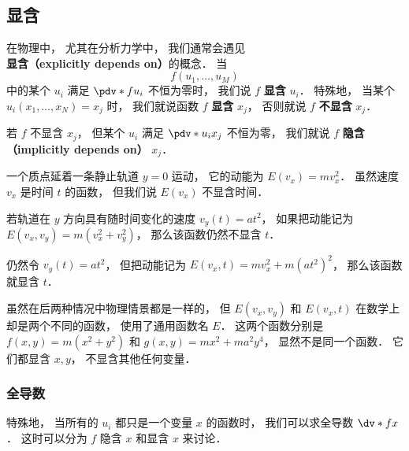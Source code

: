 \subsection{显含}
在物理中， 尤其在分析力学中， 我们通常会遇见\textbf{显含（explicitly depends on）}的概念． 当
\begin{equation}
f(u_1, \dots, u_M)
\end{equation}
中的某个 $u_i$ 满足 $\pdv*{f}{u_i}$ 不恒为零时， 我们说 $f$ \textbf{显含} $u_i$． 特殊地， 当某个 $u_i(x_1, \dots, x_N) = x_j$ 时， 我们就说函数 $f$ \textbf{显含} $x_j$， 否则就说 $f$ \textbf{不显含} $x_j$．

若 $f$ 不显含 $x_j$， 但某个 $u_i$ 满足 $\pdv*{u_i}{x_j}$ 不恒为零， 我们就说 $f$ \textbf{隐含（implicitly depends on）} $x_j$．

\begin{example}{}
一个质点延着一条静止轨道 $y = 0$ 运动， 它的动能为 $E(v_x) = m v_x^2$． 虽然速度 $v_x$ 是时间 $t$ 的函数， 但我们说 $E(v_x)$ 不显含时间．

若轨道在 $y$ 方向具有随时间变化的速度 $v_y(t) = a t^2$， 如果把动能记为 $E(v_x, v_y) = m(v_x^2 + v_y^2)$， 那么该函数仍然不显含 $t$．

仍然令 $v_y(t) = a t^2$， 但把动能记为 $E(v_x, t) = m v_x^2 + m (a t^2)^2$， 那么该函数就显含 $t$．

虽然在后两种情况中物理情景都是一样的， 但 $E(v_x, v_y)$ 和 $E(v_x, t)$ 在数学上却是两个不同的函数， 使用了通用函数名 $E$． 这两个函数分别是 $f(x, y) = m(x^2 + y^2)$ 和 $g(x, y) = mx^2 + ma^2 y^4$， 显然不是同一个函数． 它们都显含 $x, y$， 不显含其他任何变量．
\end{example}

\subsubsection{全导数}
特殊地， 当所有的 $u_i$ 都只是一个变量 $x$ 的函数时， 我们可以求全导数 $\dv*{f}{x}$． 这时可以分为 $f$ 隐含 $x$ 和显含 $x$ 来讨论．
